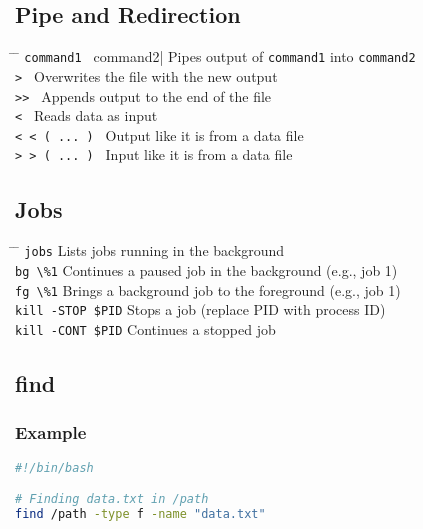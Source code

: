 \documentclass[a4paper,10pt]{article}
\begin{document}
\subsection{Pipe and Redirection}
\begin{tabbing}
	\= \hspace{60mm} \= \hspace{80mm} \kill
	\> \verb|command1 | command2| \> Pipes output of \verb|command1| into \verb|command2| \\
	\> \verb|> | \> Overwrites the file with the new output \\
	\> \verb|>> | \> Appends output to the end of the file \\
	\> \verb|< | \> Reads data as input \\
	\> \verb|< < ( ... ) | \> Output like it is from a data file \\
	\> \verb|> > ( ... ) | \> Input like it is from a data file \\
\end{tabbing}

\subsection{Jobs}
\begin{tabbing}
	\= \hspace{60mm} \= \hspace{80mm} \kill
	\> \verb|jobs| \> Lists jobs running in the background \\
	\> \verb|bg \%1| \> Continues a paused job in the background (e.g., job 1) \\
	\> \verb|fg \%1| \> Brings a background job to the foreground (e.g., job 1) \\
	\> \verb|kill -STOP $PID| \> Stops a job (replace PID with process ID) \\
	\> \verb|kill -CONT $PID| \> Continues a stopped job \\
\end{tabbing}

\subsection{find}
\subsubsection*{Example}
\begin{lstlisting}[language=bash]
#!/bin/bash

# Finding data.txt in /path
find /path -type f -name "data.txt"
\end{lstlisting}
\end{document}
